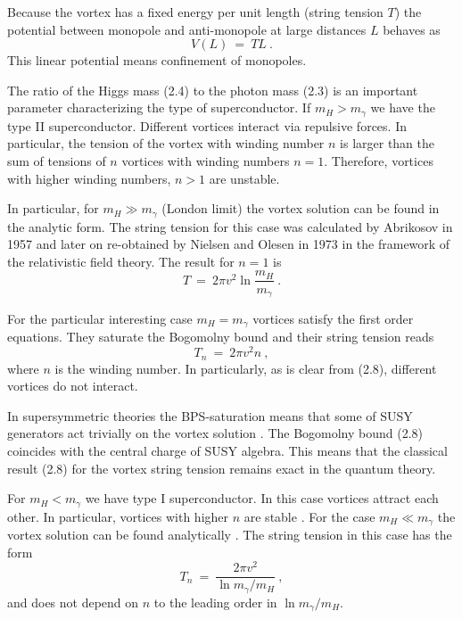 \documentclass[a4paper,12pt]{article}
\begin{document}
Because the vortex has a fixed energy per unit length (string
tension $T$) the potential between monopole and anti-monopole at
large distances $L$ behaves as
\begin{equation}
V(L)\ =\ TL\ .
\end{equation}
This linear potential means confinement of monopoles.

The ratio of the Higgs mass (2.4) to the photon mass (2.3) is an
important parameter characterizing the type of superconductor.
If $m_H>m_\gamma$ we have the type II superconductor. Different
vortices interact via repulsive forces. In particular, the
tension of the vortex with winding number $n$ is larger than the
sum of tensions of $n$ vortices with winding numbers $n=1$.
Therefore, vortices with higher winding numbers, $n>1$ are
unstable.

In particular, for $m_H\gg m_\gamma$ (London limit)
 the vortex solution can be
found in the analytic form. The string tension for this case was
calculated by Abrikosov in 1957 and later on re-obtained by
Nielsen and Olesen in 1973 \cite{ANO} in the framework of the
relativistic field theory. The result for $n=1$ is
\begin{equation}
T\ =\ 2\pi v^2\ln\frac{m_H}{m_\gamma}\ .
\end{equation}

For the particular interesting case $m_H=m_\gamma$ vortices
satisfy the first order equations. They saturate the Bogomolny bound
and their string tension reads \cite{B}
\begin{equation}
T_n\ =\ 2\pi v^2n\ ,
\end{equation}
where $n$ is the winding number.
In particularly, as is clear from (2.8), different vortices do
not interact.

In supersymmetric theories the BPS-saturation means that some of
SUSY generators act trivially on the vortex solution \cite{HS}.
The Bogomolny bound (2.8) coincides with the central charge of
SUSY algebra. This means that the classical result (2.8) for
 the vortex
string tension remains exact in the quantum theory.

For $m_H<m_\gamma$ we have type I superconductor. In this case
vortices attract each other. In particular, vortices with
higher $n$ are stable \cite{BV}. For the case $m_H\ll
m_\gamma$ the vortex solution can be found analytically
\cite{Y}. The string tension in this case has the form \cite{Y}
\begin{equation}
T_n\ =\ \frac{2\pi v^2}{\ln m_\gamma/m_H}\ ,
\end{equation}
and does not depend on $n$ to the leading order in $\ln
m_\gamma/m_H$.
\end{document}
